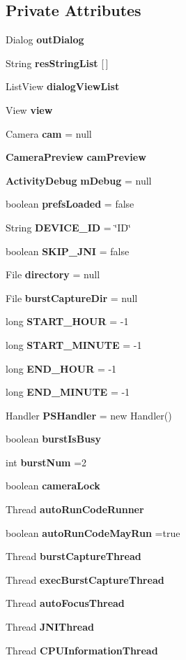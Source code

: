 \subsection*{Private Attributes}
\begin{DoxyCompactItemize}
\item 
Dialog {\bf out\+Dialog}
\item 
String {\bf res\+String\+List} [$\,$]
\item 
List\+View {\bf dialog\+View\+List}
\item 
View {\bf view}
\item 
Camera {\bf cam} = null
\item 
{\bf Camera\+Preview} {\bf cam\+Preview}
\item 
{\bf Activity\+Debug} {\bf m\+Debug} = null
\item 
boolean {\bf prefs\+Loaded} = false
\item 
String {\bf D\+E\+V\+I\+C\+E\+\_\+\+I\+D} = \char`\"{}I\+D\char`\"{}
\item 
boolean {\bf S\+K\+I\+P\+\_\+\+J\+N\+I} = false
\item 
File {\bf directory} = null
\item 
File {\bf burst\+Capture\+Dir} = null
\item 
long {\bf S\+T\+A\+R\+T\+\_\+\+H\+O\+U\+R} = -\/1
\item 
long {\bf S\+T\+A\+R\+T\+\_\+\+M\+I\+N\+U\+T\+E} = -\/1
\item 
long {\bf E\+N\+D\+\_\+\+H\+O\+U\+R} = -\/1
\item 
long {\bf E\+N\+D\+\_\+\+M\+I\+N\+U\+T\+E} = -\/1
\item 
Handler {\bf P\+S\+Handler} = new Handler()
\item 
boolean {\bf burst\+Is\+Busy}
\item 
int {\bf burst\+Num} =2
\item 
boolean {\bf camera\+Lock}
\item 
Thread {\bf auto\+Run\+Code\+Runner}
\item 
boolean {\bf auto\+Run\+Code\+May\+Run} =true
\item 
Thread {\bf burst\+Capture\+Thread}
\item 
Thread {\bf exec\+Burst\+Capture\+Thread}
\item 
Thread {\bf auto\+Focus\+Thread}
\item 
Thread {\bf J\+N\+I\+Thread}
\item 
Thread {\bf C\+P\+U\+Information\+Thread}
\item 

\end{DoxyCompactItemize}
